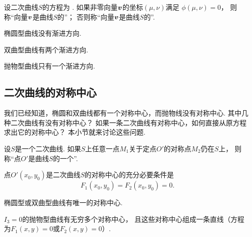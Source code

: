 \begin{definition}
设二次曲线\(S\)的方程为 .
如果非零向量\(\boldsymbol{v}\)的坐标\((\mu,\nu)\)满足
\(\phi(\mu,\nu) = 0\)，
则称“向量\(\boldsymbol{v}\)是曲线\(S\)的”；
否则称“向量\(\boldsymbol{v}\)是曲线\(S\)的”.
\end{definition}

\begin{theorem}
椭圆型曲线没有渐进方向.
\end{theorem}

\begin{theorem}
双曲型曲线有两个渐进方向.
\end{theorem}

\begin{theorem}
抛物型曲线只有一个渐进方向.
\end{theorem}

\subsection{二次曲线的对称中心}
我们已经知道，椭圆和双曲线都有一个对称中心，而抛物线没有对称中心.
其中几种二次曲线有没有对称中心？
如果一条二次曲线有对称中心，如何直接从原方程求出它的对称中心？
本小节就来讨论这些问题.

\begin{definition}
设\(S\)是一个二次曲线.
如果\(S\)上任意一点\(M_1\)关于定点\(O'\)的对称点\(M_2\)仍在\(S\)上，
则称“点\(O'\)是曲线\(S\)的一个”.
\end{definition}

\begin{theorem}
点\(O'(x_0,y_0)\)是二次曲线\(S\)的对称中心的充分必要条件是\begin{equation*}
	F_1(x_0,y_0) = F_2(x_0,y_0) = 0.
\end{equation*}
\end{theorem}

\begin{theorem}
椭圆型或双曲型曲线有唯一的对称中心.
\end{theorem}

\begin{theorem}
\(I_3 = 0\)的抛物型曲线有无穷多个对称中心，
且这些对称中心组成一条直线（方程为\(F_1(x,y) = 0\)或\(F_2(x,y) = 0\)）.
\end{theorem}


